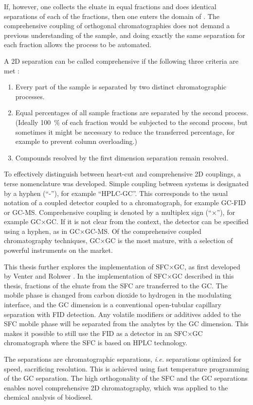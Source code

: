 If, however, one collects the eluate in equal fractions and does identical
separations of each of the fractions, then one enters the domain of
. The comprehensive coupling of
orthogonal chromatographies does not demand a previous understanding of the
sample, and doing exactly the same separation for each fraction allows the
process to be automated.

A 2D separation can be called comprehensive if the following three criteria are
met \autocite{Giddings1987}:

\begin{enumerate}
  
  \item Every part of the sample is separated by two distinct chromatographic
  processes.
  
  \item Equal percentages of all sample fractions are separated by the second
  process. (Ideally \SI{100}{\percent} of each fraction would be subjected to
  the second process, but sometimes it might be necessary to reduce the
  transferred percentage, for example to prevent column overloading.)
  
  \item Compounds resolved by the first dimension separation remain resolved.

\end{enumerate} 

To effectively distinguish between heart-cut and comprehensive 2D couplings, a
terse nomenclature was developed. Simple coupling between systems is designated
by a hyphen (``-''), for example ``HPLC-GC''. This corresponds to the usual
notation of a coupled detector coupled to a chromatograph, for example GC-FID or
GC-MS. Comprehensive coupling is denoted by a multiplex sign (``×''), for
example GC×GC. If it is not clear from the context, the detector can be
specified using a hyphen, as in GC×GC-MS. Of the comprehensive coupled
chromatography techniques, GC×GC is the most mature, with a selection of
powerful instruments on the market.

This thesis further explores the implementation of SFC×GC, as first developed by
Venter and Rohwer \autocite{Venter2004, Venter2006}. In the implementation of
SFC×GC described in this thesis, fractions of the eluate from the SFC are
transferred to the GC. The mobile phase is changed from carbon dioxide to
hydrogen in the modulating interface, and the GC dimension is a conventional
open-tubular capillary separation with FID detection. Any volatile modifiers or
additives added to the SFC mobile phase will be separated from the analytes by
the GC dimension. This makes it possible to still use the FID as a detector in
an SFC×GC chromatograph where the SFC is based on HPLC technology.

The \twoD separations are  chromatographic separations,
\textit{i.e.} separations optimized for speed, sacrificing resolution. This is
achieved using fast temperature programming of the GC separation. The high
orthogonality of the SFC and the GC separations enables novel comprehensive 2D
chromatography, which was applied to the chemical analysis of biodiesel.

